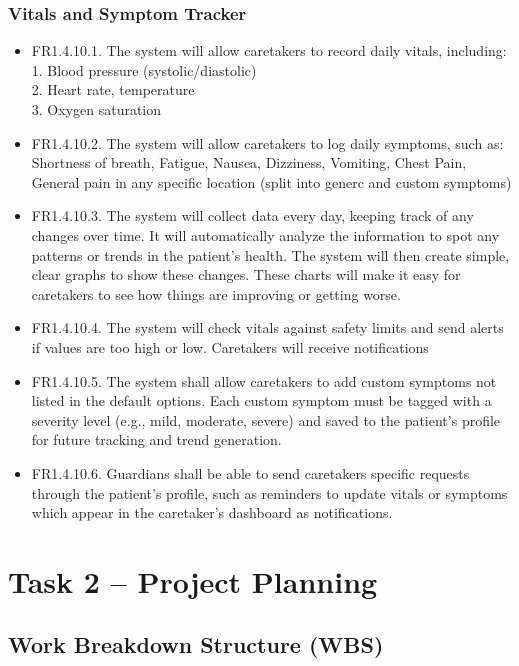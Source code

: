 \documentclass[12pt,a4paper]{article}
\begin{document}
\subsubsection{Vitals and Symptom Tracker}
\begin{itemize}
    \item FR1.4.10.1. The system will allow caretakers to record daily vitals, including: \\
1. Blood pressure (systolic/diastolic)\\ 
2. Heart rate, temperature \\
3. Oxygen saturation  
    \item FR1.4.10.2.  The system will allow caretakers to log daily symptoms, such as: Shortness of breath, Fatigue, Nausea, Dizziness, Vomiting, Chest Pain, General pain in any specific location (split into generc and custom symptoms)
    \item FR1.4.10.3. The system will collect data every day, keeping track of any changes over time. It will 
automatically analyze the information to spot any patterns or trends in the patient's 
health. The system will then create simple, clear graphs to show these changes. These 
charts will make it easy for caretakers to see how things are improving or getting 
worse. 
    \item FR1.4.10.4.  The system will check vitals against safety limits and send alerts if values are too high 
or low. Caretakers will receive notifications    
    \item FR1.4.10.5.  The system shall allow caretakers to add custom symptoms not listed in the default 
options. Each custom symptom must be tagged with a severity level (e.g., mild, 
moderate, severe) and saved to the patient’s profile for future tracking and trend 
generation. 
    \item FR1.4.10.6. Guardians shall be able to send caretakers specific requests through the patient’s 
profile, such as reminders to update vitals or symptoms which appear in the 
caretaker’s dashboard as notifications.  
\end{itemize}
\newpage
\section{Task 2 -- Project Planning}
\subsection{Work Breakdown Structure (WBS)}
\end{document}
